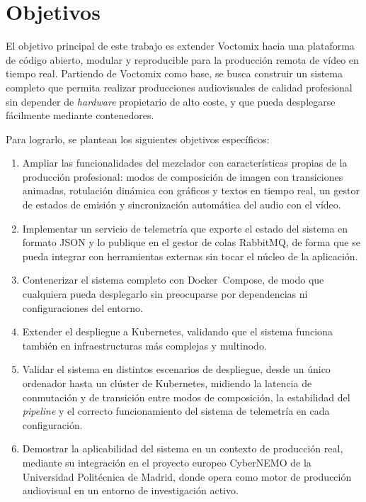 \section{Objetivos}

El objetivo principal de este trabajo es extender Voctomix hacia una plataforma de
código abierto, modular y reproducible para la producción remota de vídeo en tiempo real.
Partiendo de Voctomix como base, se busca construir un sistema completo que permita
realizar producciones audiovisuales de calidad profesional sin depender de \textit{hardware}
propietario de alto coste, y que pueda desplegarse fácilmente mediante contenedores.

Para lograrlo, se plantean los siguientes objetivos específicos:

\begin{enumerate}
  \item Ampliar las funcionalidades del mezclador con características propias de la
        producción profesional: modos de composición de imagen con transiciones animadas,
        rotulación dinámica con gráficos y textos en tiempo real,
        un gestor de estados de emisión y sincronización automática del audio con el vídeo.

  \item Implementar un servicio de telemetría que exporte el estado del sistema en
        formato \ac{JSON} y lo publique en el gestor de colas RabbitMQ, de forma que
        se pueda integrar con herramientas externas sin tocar el núcleo de la aplicación.

  \item Contenerizar el sistema completo con Docker~Compose, de modo que
        cualquiera pueda desplegarlo sin preocuparse por
        dependencias ni configuraciones del entorno.

  \item Extender el despliegue a Kubernetes, validando que el sistema funciona también
        en infraestructuras más complejas y multinodo.

  \item Validar el sistema en distintos escenarios de despliegue, desde un único
        ordenador hasta un clúster de Kubernetes, midiendo la latencia de conmutación
        y de transición entre modos de composición, la estabilidad del \textit{pipeline} y el correcto funcionamiento del sistema
        de telemetría en cada configuración.

  \item Demostrar la aplicabilidad del sistema en un contexto de producción real,
        mediante su integración en el proyecto europeo CyberNEMO de la Universidad
        Politécnica de Madrid, donde opera como motor de producción audiovisual en
        un entorno de investigación activo.
\end{enumerate}
